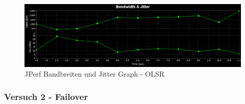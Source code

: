 \documentclass[10pt]{scrartcl}
\begin{document}
\begin{figure}[htbp]
	\centering	\includegraphics[width=1.0\textwidth]{Grafiken/OLSR_TX1_Grafik.png}
	\caption{JPerf Bandbreiten und Jitter Graph - OLSR}
	\label{fig:JPerf_OLSR_Graph}
\end{figure} 

\subsubsection{Versuch 2 - Failover}
\end{document}
